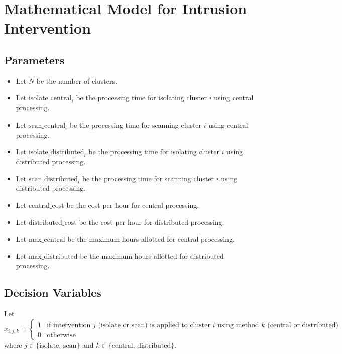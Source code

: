 \documentclass{article}
\begin{document}
\section*{Mathematical Model for Intrusion Intervention}

\subsection*{Parameters}
\begin{itemize}
    \item Let \( N \) be the number of clusters.
    \item Let \( \text{isolate\_central}_{i} \) be the processing time for isolating cluster \( i \) using central processing.
    \item Let \( \text{scan\_central}_{i} \) be the processing time for scanning cluster \( i \) using central processing.
    \item Let \( \text{isolate\_distributed}_{i} \) be the processing time for isolating cluster \( i \) using distributed processing.
    \item Let \( \text{scan\_distributed}_{i} \) be the processing time for scanning cluster \( i \) using distributed processing.
    \item Let \( \text{central\_cost} \) be the cost per hour for central processing.
    \item Let \( \text{distributed\_cost} \) be the cost per hour for distributed processing.
    \item Let \( \text{max\_central} \) be the maximum hours allotted for central processing.
    \item Let \( \text{max\_distributed} \) be the maximum hours allotted for distributed processing.
\end{itemize}

\subsection*{Decision Variables}
Let 
\[
x_{i,j,k} = 
\begin{cases} 
1 & \text{if intervention } j \text{ (isolate or scan) is applied to cluster } i \text{ using method } k \text{ (central or distributed)} \\ 
0 & \text{otherwise}
\end{cases}
\]
where \( j \in \{ \text{isolate, scan} \} \) and \( k \in \{ \text{central, distributed} \} \).
\end{document}
